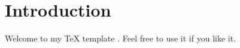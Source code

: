 \documentclass{article}
\begin{document}


\section{Introduction}

Welcome to my TeX template \cite{MyCitation}.  Feel free to use it if you like it.




\end{document}
